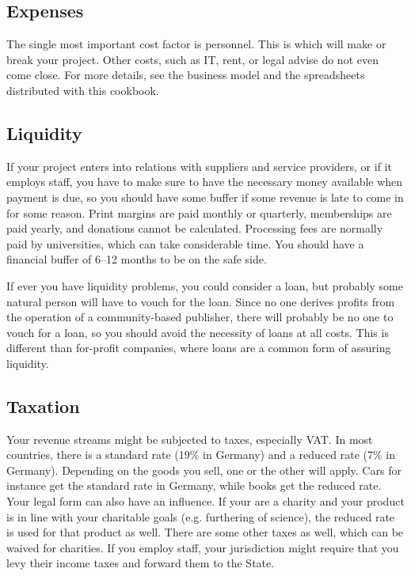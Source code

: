 \documentclass[guidelines,nonflat,modfonts] {langsci/langscibook}
\begin{document}
\subsection{Expenses}
The single most important cost factor is personnel.  This is which will make or break your project. Other costs, such as IT, rent, or legal advise do not even come close. For more details, see the business model and the spreadsheets distributed with this cookbook. 

\subsection{Liquidity}
If your project enters into relations with suppliers and service providers, or if it employs staff, you have to make sure to have the necessary money available when payment is due, so you should have some buffer if some revenue is late to come in for some reason. Print margins are paid monthly or quarterly, memberships are paid yearly, and donations cannot be calculated. Processing fees are normally paid by universities, which can take considerable time. You should have a financial buffer of 6--12 months to be on the safe side. 

If ever you have liquidity problems, you could consider a loan, but probably some natural person will have to vouch for the loan. Since no one derives profits from the operation of a community-based publisher, there will probably be no one to vouch for a loan, so you should avoid the necessity of loans at all costs. This is different than for-profit companies, where loans are a common form of assuring liquidity. 
   
\subsection{Taxation}
Your revenue streams might be subjected to taxes, especially VAT. In most countries, there is a standard rate (19\% in Germany) and a reduced rate (7\% in Germany). Depending on the goods you sell, one or the other will apply. Cars for instance get the standard rate in Germany, while books get the reduced rate. Your legal form can also have an influence. If your are a charity and your product is in line with your charitable goals (e.g. furthering of science), the reduced rate is used for that product as well. There are some other taxes as well, which can be waived for charities. If you employ staff, your jurisdiction might require that you levy their income taxes and forward them to the State.
\end{document}
